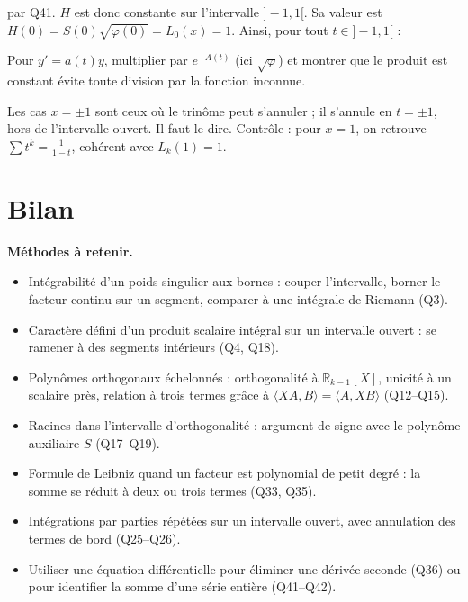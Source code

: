 \documentclass[11pt,a4paper]{article}
\providecommand{\tightlist}{\setlength{\itemsep}{0pt}\setlength{\parskip}{0pt}}
\newcommand{\equationajustee}[1]{%
  \sbox{\boiteequation}{$\displaystyle #1$}%
  \ifdim\wd\boiteequation>\linewidth
    \[\resizebox{\linewidth}{!}{\usebox{\boiteequation}}\]%
  \else
    \[#1\]%
  \fi}
\begin{document}
par Q41. \(H\) est donc constante sur l'intervalle \(]-1,1[\). Sa valeur est \(H(0)=S(0)\sqrt{\varphi(0)}=L_0(x)=1\). Ainsi, pour tout \(t\in]-1,1[\) :

\equationajustee{\sum_{k=0}^{+\infty}L_k(x)t^k=\frac1{\sqrt{1-2tx+t^2}}.}

\begin{methode}

Pour \(y'=a(t)y\), multiplier par \(e^{-A(t)}\) (ici \(\sqrt\varphi\)) et montrer que le produit est constant évite toute division par la fonction inconnue.

\end{methode}

\begin{piege}

Les cas \(x=\pm1\) sont ceux où le trinôme peut s'annuler ; il s'annule en \(t=\pm1\), hors de l'intervalle ouvert. Il faut le dire. Contrôle : pour \(x=1\), on retrouve \(\sum t^k=\frac1{1-t}\), cohérent avec \(L_k(1)=1\).

\end{piege}

\hypertarget{bilan}{%
\section{Bilan}\label{bilan}}

\textbf{Méthodes à retenir.}

\begin{itemize}
\tightlist
\item
  Intégrabilité d'un poids singulier aux bornes : couper l'intervalle, borner le facteur continu sur un segment, comparer à une intégrale de Riemann (Q3).
\item
  Caractère défini d'un produit scalaire intégral sur un intervalle ouvert : se ramener à des segments intérieurs (Q4, Q18).
\item
  Polynômes orthogonaux échelonnés : orthogonalité à \(\mathbb R_{k-1}[X]\), unicité à un scalaire près, relation à trois termes grâce à \(\langle XA,B\rangle=\langle A,XB\rangle\) (Q12--Q15).
\item
  Racines dans l'intervalle d'orthogonalité : argument de signe avec le polynôme auxiliaire \(S\) (Q17--Q19).
\item
  Formule de Leibniz quand un facteur est polynomial de petit degré : la somme se réduit à deux ou trois termes (Q33, Q35).
\item
  Intégrations par parties répétées sur un intervalle ouvert, avec annulation des termes de bord (Q25--Q26).
\item
  Utiliser une équation différentielle pour éliminer une dérivée seconde (Q36) ou pour identifier la somme d'une série entière (Q41--Q42).
\end{itemize}
\end{document}
